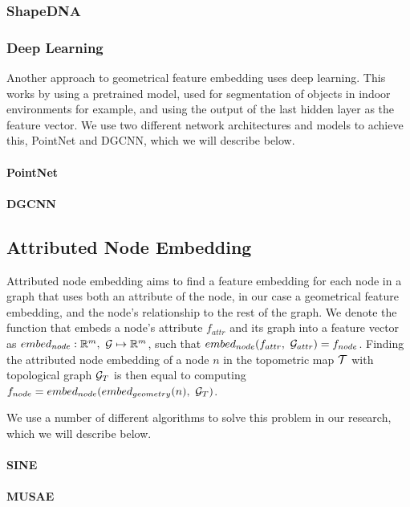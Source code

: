 \subsubsection{ShapeDNA}

\subsubsection{Deep Learning}
Another approach to geometrical feature embedding uses deep learning. This works by using a pretrained model, used for segmentation of objects in indoor environments for example, and using the output of the last hidden layer as the feature vector. We use two different network architectures and models to achieve this, PointNet and DGCNN, which we will describe below. 

\paragraph{PointNet}
\paragraph{DGCNN}

\subsection{Attributed Node Embedding}

Attributed node embedding aims to find a feature embedding for each node in a graph that uses both an attribute of the node, in our case a geometrical feature embedding, and the node's relationship to the rest of the graph. We denote the function that embeds a node's attribute \(f_{attr}\) and its graph into a feature vector as \(embed_{node}: \mathbb{R}^m,\ \mathcal{G} \mapsto \mathbb{R}^m\), such that \(embed_{node}(f_{attr},\ \mathcal{G}_{attr}) = f_{node}\). Finding the attributed node embedding of a node \(n\) in the topometric map \(\mathcal{T}\) with topological graph \(\mathcal{G}_{T}\) is then equal to computing \(f_{node}=embed_{node}(embed_{geometry}(n),\ \graph_{T})\).

We use a number of different algorithms to solve this problem in our research, which we will describe below.

\paragraph{SINE}
\paragraph{MUSAE}

